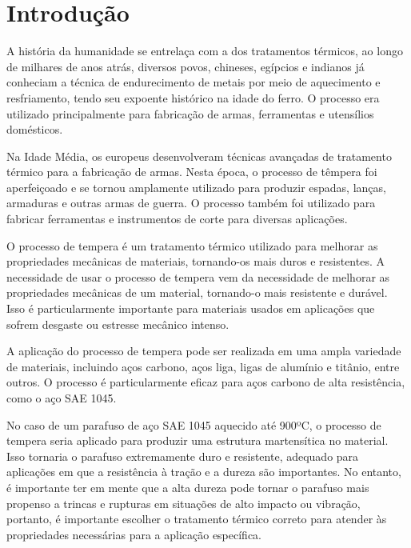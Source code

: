 \section{Introdução}\label{Intro}

A história da humanidade se entrelaça com a dos tratamentos térmicos, ao longo de milhares de anos atrás, diversos povos, chineses, egípcios e indianos já conheciam a técnica de endurecimento de metais por meio de aquecimento e resfriamento, tendo seu expoente histórico na idade do ferro. O processo era utilizado principalmente para fabricação de armas, ferramentas e utensílios domésticos.

Na Idade Média, os europeus desenvolveram técnicas avançadas de tratamento térmico para a fabricação de armas. Nesta época, o processo de têmpera foi aperfeiçoado e se tornou amplamente utilizado para produzir espadas, lanças, armaduras e outras armas de guerra. O processo também foi utilizado para fabricar ferramentas e instrumentos de corte para diversas aplicações.

O processo de tempera é um tratamento térmico utilizado para melhorar as propriedades mecânicas de materiais, tornando-os mais duros e resistentes. A necessidade de usar o processo de tempera vem da necessidade de melhorar as propriedades mecânicas de um material, tornando-o mais resistente e durável. Isso é particularmente importante para materiais usados em aplicações que sofrem desgaste ou estresse mecânico intenso.

A aplicação do processo de tempera pode ser realizada em uma ampla variedade de materiais, incluindo aços carbono, aços liga, ligas de alumínio e titânio, entre outros. O processo é particularmente eficaz para aços carbono de alta resistência, como o aço SAE 1045.

No caso de um parafuso de aço SAE 1045 aquecido até 900ºC, o processo de tempera seria aplicado para produzir uma estrutura martensítica no material. Isso tornaria o parafuso extremamente duro e resistente, adequado para aplicações em que a resistência à tração e a dureza são importantes. No entanto, é importante ter em mente que a alta dureza pode tornar o parafuso mais propenso a trincas e rupturas em situações de alto impacto ou vibração, portanto, é importante escolher o tratamento térmico correto para atender às propriedades necessárias para a aplicação específica.